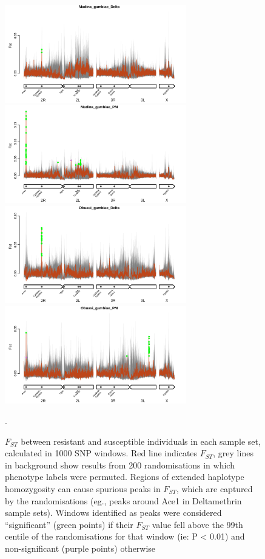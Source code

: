 \documentclass[a4paper,12pt]{article}
\begin{document}
\begin{figure}[h]
	\vskip 0.4cm
	\includegraphics*[width = 7.9cm]{../../randomisations/Fst/Madina_gambiae_Delta_peak_filter_plot.png}
	\includegraphics*[width = 7.9cm]{../../randomisations/Fst/Madina_gambiae_PM_peak_filter_plot.png}
	\vskip 0.4cm
	\includegraphics*[width = 7.9cm]{../../randomisations/Fst/Obuasi_gambiae_Delta_peak_filter_plot.png}
	\includegraphics*[width = 7.9cm]{../../randomisations/Fst/Obuasi_gambiae_PM_peak_filter_plot.png}
	\caption{\footnotesize $F_{ST}$ between resistant and susceptible individuals in each sample set, calculated in 1000 SNP windows. Red line indicates $F_{ST}$, grey lines in background show results from 200 randomisations in which phenotype labels were permuted. Regions of extended haplotype homozygosity can cause spurious peaks in $F_{ST}$, which are captured by the randomisations (eg., peaks around Ace1 in Deltamethrin sample sets). Windows identified as peaks were considered ``significant'' (green points) if their $F_{ST}$ value fell above the 99th centile of the randomisations for that window (ie: P < 0.01) and non-significant (purple points) otherwise}.
	\label{FigS2}
\end{figure}
\end{document}

